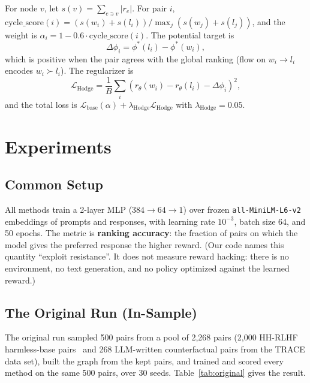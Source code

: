 \documentclass{article}
\begin{document}
For node $v$, let $s(v) = \sum_{e \ni v} |r_e|$. For pair $i$, $\text{cycle\_score}(i) = (s(w_i) + s(l_i)) / \max_j (s(w_j) + s(l_j))$, and the weight is $\alpha_i = 1 - 0.6 \cdot \text{cycle\_score}(i)$. The potential target is
\begin{equation}
    \Delta\phi_i = \phi^*(l_i) - \phi^*(w_i),
\label{eq:potential_diff}
\end{equation}
which is positive when the pair agrees with the global ranking (flow on $w_i \to l_i$ encodes $w_i \succ l_i$). The regularizer is
\begin{equation}
    \mathcal{L}_\text{Hodge} = \frac{1}{B} \sum_{i} \left(r_\theta(w_i) - r_\theta(l_i) - \Delta\phi_i\right)^2 ,
\label{eq:hodge_loss}
\end{equation}
and the total loss is $\mathcal{L}_\text{base}(\alpha) + \lambda_\text{Hodge} \mathcal{L}_\text{Hodge}$ with $\lambda_\text{Hodge} = 0.05$.

\section{Experiments}
\label{sec:experiments}

\subsection{Common Setup}

All methods train a 2-layer MLP ($384 \to 64 \to 1$) over frozen \texttt{all-MiniLM-L6-v2} embeddings of prompts and responses, with learning rate $10^{-3}$, batch size 64, and 50 epochs. The metric is \textbf{ranking accuracy}: the fraction of pairs on which the model gives the preferred response the higher reward. (Our code names this quantity ``exploit resistance''. It does not measure reward hacking: there is no environment, no text generation, and no policy optimized against the learned reward.)

\subsection{The Original Run (In-Sample)}
\label{sec:original}

The original run sampled 500 pairs from a pool of 2,268 pairs (2,000 HH-RLHF harmless-base pairs~\citep{bai2022training} and 268 LLM-written counterfactual pairs from the TRACE data set), built the graph from the kept pairs, and trained and scored every method on the same 500 pairs, over 30 seeds. Table~\ref{tab:original} gives the result.
\end{document}
